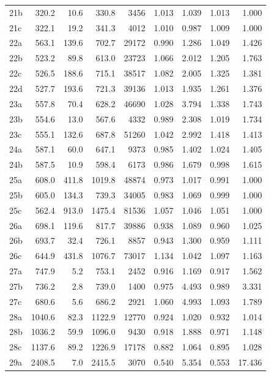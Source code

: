 \begin{center}
\begin{longtable}{@{}l@{\hspace{6pt}}rrrr@{\hspace{8pt}}rrrr@{}}
21b & 320.2 & 10.6 & 330.8 & 3456 & 1.013 & 1.039 & 1.013 & 1.000 \\
21c & 322.1 & 19.2 & 341.3 & 4012 & 1.010 & 0.987 & 1.009 & 1.000 \\
22a & 563.1 & 139.6 & 702.7 & 29172 & 0.990 & 1.286 & 1.049 & 1.426 \\
22b & 523.2 & 89.8 & 613.0 & 23723 & 1.066 & 2.012 & 1.205 & 1.763 \\
22c & 526.5 & 188.6 & 715.1 & 38517 & 1.082 & 2.005 & 1.325 & 1.381 \\
22d & 527.7 & 193.6 & 721.3 & 39136 & 1.013 & 1.935 & 1.261 & 1.376 \\
23a & 557.8 & 70.4 & 628.2 & 46690 & 1.028 & 3.794 & 1.338 & 1.743 \\
23b & 554.6 & 13.0 & 567.6 & 4332 & 0.989 & 2.308 & 1.019 & 1.734 \\
23c & 555.1 & 132.6 & 687.8 & 51260 & 1.042 & 2.992 & 1.418 & 1.413 \\
24a & 587.1 & 60.0 & 647.1 & 9373 & 0.985 & 1.402 & 1.024 & 1.405 \\
24b & 587.5 & 10.9 & 598.4 & 6173 & 0.986 & 1.679 & 0.998 & 1.615 \\
25a & 608.0 & 411.8 & 1019.8 & 48874 & 0.973 & 1.017 & 0.991 & 1.000 \\
25b & 605.0 & 134.3 & 739.3 & 34005 & 0.983 & 1.069 & 0.999 & 1.000 \\
25c & 562.4 & 913.0 & 1475.4 & 81536 & 1.057 & 1.046 & 1.051 & 1.000 \\
26a & 698.1 & 119.6 & 817.7 & 39886 & 0.938 & 1.089 & 0.960 & 1.025 \\
26b & 693.7 & 32.4 & 726.1 & 8857 & 0.943 & 1.300 & 0.959 & 1.111 \\
26c & 644.9 & 431.8 & 1076.7 & 73017 & 1.134 & 1.042 & 1.097 & 1.163 \\
27a & 747.9 & 5.2 & 753.1 & 2452 & 0.916 & 1.169 & 0.917 & 1.562 \\
27b & 736.2 & 2.8 & 739.0 & 1400 & 0.975 & 4.493 & 0.989 & 3.331 \\
27c & 680.6 & 5.6 & 686.2 & 2921 & 1.060 & 4.993 & 1.093 & 1.789 \\
28a & 1040.6 & 82.3 & 1122.9 & 12770 & 0.924 & 1.020 & 0.932 & 1.014 \\
28b & 1036.2 & 59.9 & 1096.0 & 9430 & 0.918 & 1.888 & 0.971 & 1.148 \\
28c & 1137.6 & 89.2 & 1226.9 & 17178 & 0.882 & 1.064 & 0.895 & 1.028 \\
29a & 2408.5 & 7.0 & 2415.5 & 3070 & 0.540 & 5.354 & 0.553 & 17.436 \\

\end{longtable}
\end{center}
